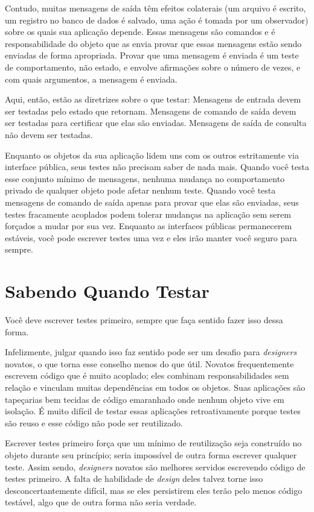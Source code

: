 Contudo, muitas mensagens de saída têm efeitos colaterais (um arquivo é escrito, um registro no banco de dados é salvado, uma ação é tomada por um observador) sobre os quais sua aplicação depende. Essas mensagens são comandos e é responsabilidade do objeto que as envia provar que essas mensagens estão sendo enviadas de forma apropriada. Provar que uma mensagem é enviada é um teste de comportamento, não estado, e envolve afirmações sobre o número de vezes, e com quais argumentos, a mensagem é enviada.

Aqui, então, estão as diretrizes sobre o que testar: Mensagens de entrada devem ser testadas pelo estado que retornam. Mensagens de comando de saída devem ser testadas para certificar que elas são enviadas. Mensagens de saída de consulta não devem ser testadas.

Enquanto os objetos da sua aplicação lidem uns com os outros estritamente via interface pública, seus testes não precisam saber de nada mais. Quando você testa esse conjunto mínimo de mensagens, nenhuma mudança no comportamento privado de qualquer objeto pode afetar nenhum teste. Quando você testa mensagens de comando de saída apenas para provar que elas são enviadas, seus testes fracamente acoplados podem tolerar mudanças na aplicação sem serem forçados a mudar por sua vez. Enquanto as interfaces públicas permanecerem estáveis, você pode escrever testes uma vez e eles irão manter você seguro para sempre.

\section{Sabendo Quando Testar}

Você deve escrever testes primeiro, sempre que faça sentido fazer isso dessa forma.

Infelizmente, julgar quando isso faz sentido pode ser um desafio para \textit{designers} novatos, o que torna esse conselho menos do que útil. Novatos frequentemente escrevem código que é muito acoplado; eles combinam responsabilidades sem relação e vinculam muitas dependências em todos os objetos. Suas aplicações são tapeçarias bem tecidas de código emaranhado onde nenhum objeto vive em isolação. É muito difícil de testar essas aplicações retroativamente porque testes são reuso e esse código não pode ser reutilizado.

Escrever testes primeiro força que um mínimo de reutilização seja construído no objeto durante seu princípio; seria impossível de outra forma escrever qualquer teste. Assim sendo, \textit{designers} novatos são melhores servidos escrevendo código de testes primeiro. A falta de habilidade de \textit{design} deles talvez torne isso desconcertantemente difícil, mas se eles persistirem eles terão pelo menos código testável, algo que de outra forma não seria verdade.

